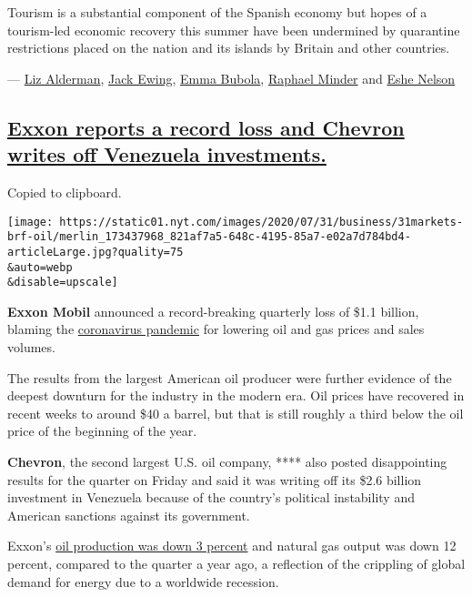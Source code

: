 Tourism is a substantial component of the Spanish economy but hopes of a
tourism-led economic recovery this summer have been undermined by
quarantine restrictions placed on the nation and its islands by Britain
and other countries.

--- \href{https://www.nytimes.com/by/liz-alderman}{Liz Alderman},
\href{https://www.nytimes.com/by/jack-ewing}{Jack Ewing},
\href{https://www.nytimes.com/by/emma-bubola}{Emma Bubola},
\href{https://www.nytimes.com/by/raphael-minder}{Raphael Minder} and
\href{https://www.nytimes.com/by/eshe-nelson}{Eshe Nelson}

\hypertarget{exxon-reports-a-record-loss-and-chevron-writes-off-venezuela-investments}{%
\subsection{\texorpdfstring{\protect\hyperlink{exxon-reports-a-record-loss-and-chevron-writes-off-venezuela-investments}{Exxon
reports a record loss and Chevron writes off Venezuela
investments.}}{Exxon reports a record loss and Chevron writes off Venezuela investments.}}\label{exxon-reports-a-record-loss-and-chevron-writes-off-venezuela-investments}}

Copied to clipboard.

\texttt{[image: https://static01.nyt.com/images/2020/07/31/business/31markets-brf-oil/merlin\_173437968\_821af7a5-648c-4195-85a7-e02a7d784bd4-articleLarge.jpg?quality=75\\\&auto=webp\\\&disable=upscale]}

\textbf{Exxon Mobil} announced a record-breaking quarterly loss of \$1.1
billion, blaming the
\href{https://www.nytimes.com/2020/03/31/business/energy-environment/crude-oil-companies-coronavirus.html}{coronavirus
pandemic} for lowering oil and gas prices and sales volumes.

The results from the largest American oil producer were further evidence
of the deepest downturn for the industry in the modern era. Oil prices
have recovered in recent weeks to around \$40 a barrel, but that is
still roughly a third below the oil price of the beginning of the year.

\textbf{Chevron}, the second largest U.S. oil company, **** also posted
disappointing results for the quarter on Friday and said it was writing
off its \$2.6 billion investment in Venezuela because of the country's
political instability and American sanctions against its government.

Exxon's
\href{https://corporate.exxonmobil.com/Investors/Investor-relations}{oil
production was down 3 percent} and natural gas output was down 12
percent, compared to the quarter a year ago, a reflection of the
crippling of global demand for energy due to a worldwide recession.

